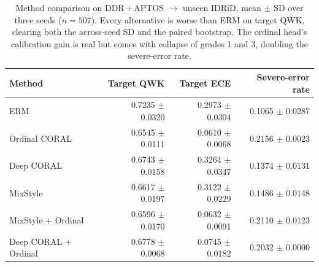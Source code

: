 \begin{table}[t]
\centering
\caption{Method comparison on DDR\,+\,APTOS $\rightarrow$ unseen IDRiD, mean $\pm$ SD over three seeds ($n=507$). Every alternative is worse than ERM on target QWK, clearing both the across-seed SD and the paired bootstrap. The ordinal head's calibration gain is real but comes with collapse of grades 1 and 3, doubling the severe-error rate.}
\label{tab:methods}
\begin{tabular}{lrrr}
\toprule
Method & Target QWK & Target ECE & Severe-error rate \\
\midrule
ERM & 0.7235 $\pm$ 0.0320 & 0.2973 $\pm$ 0.0304 & 0.1065 $\pm$ 0.0287 \\
Ordinal CORAL & 0.6545 $\pm$ 0.0111 & 0.0610 $\pm$ 0.0068 & 0.2156 $\pm$ 0.0023 \\
Deep CORAL & 0.6743 $\pm$ 0.0158 & 0.3264 $\pm$ 0.0347 & 0.1374 $\pm$ 0.0131 \\
MixStyle & 0.6617 $\pm$ 0.0197 & 0.3122 $\pm$ 0.0229 & 0.1486 $\pm$ 0.0148 \\
MixStyle + Ordinal & 0.6596 $\pm$ 0.0170 & 0.0632 $\pm$ 0.0091 & 0.2110 $\pm$ 0.0123 \\
Deep CORAL + Ordinal & 0.6778 $\pm$ 0.0068 & 0.0745 $\pm$ 0.0182 & 0.2032 $\pm$ 0.0000 \\
\bottomrule
\end{tabular}
\end{table}